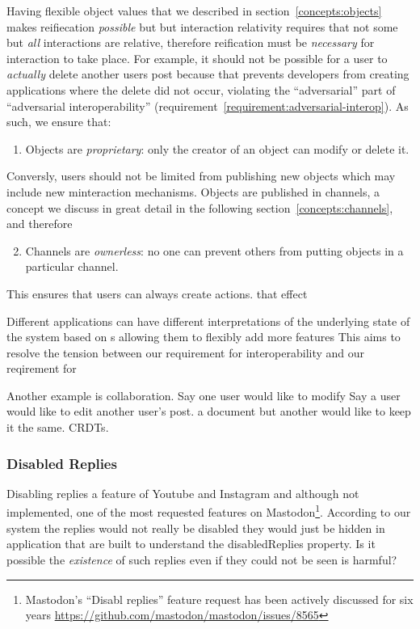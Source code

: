 Having flexible object values that we described in section~\ref{concepts:objects} makes reifiecation \emph{possible} but
but interaction relativity requires that not some but \emph{all} interactions
are relative, therefore reification must be \emph{necessary}
for interaction to take place.
For example, it should not be possible for a user to \emph{actually}
delete another users post because that prevents developers from
creating applications where the delete did not occur, violating the
``adversarial'' part of ``adversarial interoperability''
(requirement~\ref{requirement:adversarial-interop}).
As such, we ensure that:
\begin{enumerate}
\item
Objects are \emph{proprietary}: only the creator of an object can modify or delete it.
\end{enumerate}
Conversly, users should not be limited from publishing new objects
which may include new minteraction mechanisms.
Objects are published in channels, a concept we discuss in great detail
in the following section~\ref{concepts:channels}, and therefore
\begin{enumerate}
\setcounter{enumi}{1}
\item
Channels are \emph{ownerless}: no one can prevent others from putting objects in a particular channel.
\end{enumerate}
This ensures that users can always create actions.
that effect

Different applications can have different interpretations of the
underlying state of the system based on s
allowing them to flexibly add more features
This aims to resolve the tension between our requirement for interoperability
and our reqirement for


Another example is collaboration. Say one user would like to modify
Say a user would like to edit another user's post.
a document but another would like to keep it the same. CRDTs.


\subsubsection{Disabled Replies}

Disabling replies a feature of Youtube and Instagram and although not
implemented, one of the most requested features on Mastodon\footnote{
    Mastodon's ``Disabl replies'' feature request has been actively discussed
    for six years
    \url{https://github.com/mastodon/mastodon/issues/8565}
}.
According to our system the replies would not really be disabled
they would just be hidden in application that are built to understand
the disabledReplies property.
Is it possible the \emph{existence} of such replies even if they could
not be seen is harmful?

